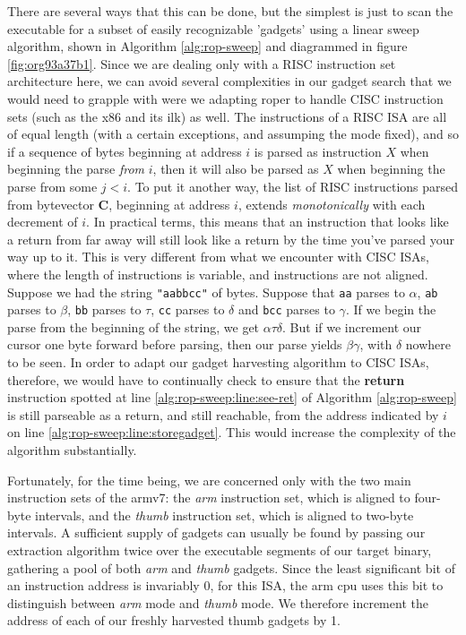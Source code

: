 \documentclass[12pt,glossary]{dalthesis}
\begin{document}
There are several ways that this can be done, but the simplest is just to
scan the executable for a subset of easily recognizable 'gadgets' using a
linear sweep algorithm, shown in Algorithm \ref{alg:rop-sweep} and diagrammed 
in figure \ref{fig:org93a37b1}. Since we are
dealing only with a RISC instruction set architecture here, we can avoid 
several complexities in our gadget search that we would need to grapple with
were we adapting \gls{roper} to handle CISC instruction sets (such as the x86 and
its ilk) as well. The instructions of a RISC ISA are all of equal length
(with a certain exceptions, and assumping the mode fixed), and so if a
sequence of bytes beginning at address \(i\) is parsed as instruction \(X\)
when beginning the parse \emph{from} \(i\), then it will also be parsed as \(X\)
when beginning the parse from some \(j < i\). To put it another way, the
list of RISC instructions parsed from bytevector \(\mathbf{C}\), beginning
at address \(i\), extends \emph{monotonically} with each decrement of \(i\).
In practical terms, this means that an instruction that looks like a
return from far away will still look like a return by the time you've parsed your
way up to it. This is very different from what we encounter with CISC ISAs,
where the length of instructions is variable, and instructions are not aligned.
Suppose we had the string \texttt{"aabbcc"} of bytes. Suppose that \texttt{aa} parses to
\(\alpha\), \texttt{ab} parses to \(\beta\), \texttt{bb} parses to \(\tau\), \texttt{cc} parses to \(\delta\) and
\texttt{bcc} parses to \(\gamma\). If we begin the parse from the beginning of the string,
we get \(\alpha \tau \delta\). But if we increment our cursor one byte forward
before parsing, then our parse yields \(\beta \gamma\), with \(\delta\) nowhere
to be seen. In order to adapt our gadget harvesting algorithm to CISC ISAs,
therefore, we would have to continually check to ensure that the \textbf{return}
instruction spotted at line \ref{alg:rop-sweep:line:see-ret} of
Algorithm \ref{alg:rop-sweep} is still parseable as a return, and still reachable, from
the address indicated by \(i\) on line \ref{alg:rop-sweep:line:storegadget}. This
would increase the complexity of the algorithm substantially. 

Fortunately, for the time being, we are concerned only with the two main instruction
sets of the \gls{armv7}: the \emph{arm} instruction set, which is aligned to four-byte intervals, 
and the \emph{thumb} instruction set, which is aligned to two-byte intervals. A sufficient
supply of gadgets can usually be found by passing our extraction algorithm twice
over the executable segments of our target binary, gathering a pool of both \emph{arm}
and \emph{thumb} gadgets. Since the least significant bit of an instruction address is
invariably 0, for this ISA, the \gls{arm} \gls{cpu} uses this bit to distinguish between \emph{arm}
mode and \emph{thumb} mode. We therefore increment the address of each of our freshly
harvested thumb gadgets by 1.
\end{document}
